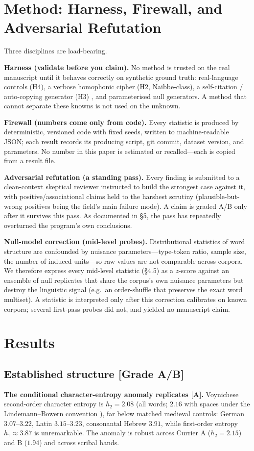 \documentclass[11pt]{article}
\newcommand{\grade}[1]{{\small\textbf{[#1]}}}
\begin{document}
\section{Method: Harness, Firewall, and Adversarial Refutation}
Three disciplines are load-bearing.

\textbf{Harness (validate before you claim).} No method is trusted on the real
manuscript until it behaves correctly on synthetic ground truth: real-language
controls (H4), a verbose homophonic cipher (H2, Naibbe-class), a self-citation /
auto-copying generator (H3) \citep{timm2020selfcitation}, and parameterised null
generators. A method that cannot separate these knowns is not used on the unknown.

\textbf{Firewall (numbers come only from code).} Every statistic is produced by
deterministic, versioned code with fixed seeds, written to machine-readable JSON;
each result records its producing script, git commit, dataset version, and
parameters. No number in this paper is estimated or recalled---each is copied from a
result file.

\textbf{Adversarial refutation (a standing pass).} Every finding is submitted to a
clean-context skeptical reviewer instructed to build the strongest case against it,
with positive/associational claims held to the harshest scrutiny (plausible-but-wrong
positives being the field's main failure mode). A claim is graded A/B only after it
survives this pass. As documented in \S5, the pass has repeatedly overturned the
program's own conclusions.

\textbf{Null-model correction (mid-level probes).} Distributional statistics of word
structure are confounded by nuisance parameters---type-token ratio, sample size, the
number of induced units---so raw values are not comparable across corpora. We therefore
express every mid-level statistic (\S4.5) as a $z$-score against an ensemble of null
replicates that share the corpus's own nuisance parameters but destroy the linguistic
signal (e.g.\ an order-shuffle that preserves the exact word multiset). A statistic is
interpreted only after this correction calibrates on known corpora; several first-pass
probes did not, and yielded no manuscript claim.

\section{Results}

\subsection{Established structure \grade{Grade A/B}}
\textbf{The conditional character-entropy anomaly replicates \grade{A}.} Voynichese
second-order character entropy is $h_2 = 2.08$ (all words; $2.16$ with spaces under
the Lindemann--Bowern convention \citep{lindemann2022entropy}), far below matched
medieval controls: German $3.07$--$3.22$, Latin $3.15$--$3.23$, consonantal Hebrew
$3.91$, while first-order entropy $h_1\approx 3.87$ is unremarkable. The anomaly is
robust across Currier A ($h_2=2.15$) and B ($1.94$) and across scribal hands.
\end{document}
